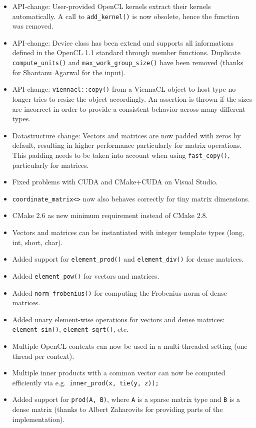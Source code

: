 \begin{itemize}
 \item API-change: User-provided OpenCL kernels extract their kernels automatically. A call to \lstinline|add_kernel()| is now obsolete, hence the function was removed.
 \item API-change: Device class has been extend and supports all informations defined in the OpenCL 1.1 standard through member functions. Duplicate \lstinline|compute_units()| and \lstinline|max_work_group_size()| have been removed (thanks for Shantanu Agarwal for the input).
 \item API-change: \lstinline|viennacl::copy()| from a ViennaCL object to host type no longer tries to resize the object accordingly. An assertion is thrown if the sizes are incorrect in order to provide a consistent behavior across many different types.
 \item Datastructure change: Vectors and matrices are now padded with zeros by default, resulting in higher performance particularly for matrix operations. This padding needs to be taken into account when using \lstinline|fast_copy()|, particularly for matrices.
 \item Fixed problems with CUDA and CMake+CUDA on Visual Studio.
 \item \lstinline|coordinate_matrix<>| now also behaves correctly for tiny matrix dimensions.
 \item CMake 2.6 as new minimum requirement instead of CMake 2.8.
 \item Vectors and matrices can be instantiated with integer template types (long, int, short, char).
 \item Added support for \lstinline|element_prod()| and \lstinline|element_div()| for dense matrices.
 \item Added \lstinline|element_pow()| for vectors and matrices.
 \item Added \lstinline|norm_frobenius()| for computing the Frobenius norm of dense matrices.
 \item Added unary element-wise operations for vectors and dense matrices: \lstinline|element_sin()|, \lstinline|element_sqrt()|, etc.
 \item Multiple OpenCL contexts can now be used in a multi-threaded setting (one thread per context).
 \item Multiple inner products with a common vector can now be computed efficiently via e.g.~\lstinline|inner_prod(x, tie(y, z));|
 \item Added support for \lstinline|prod(A, B)|, where \lstinline|A| is a sparse matrix type and \lstinline|B| is a dense matrix (thanks to Albert Zaharovits for providing parts of the implementation).

\end{itemize}
